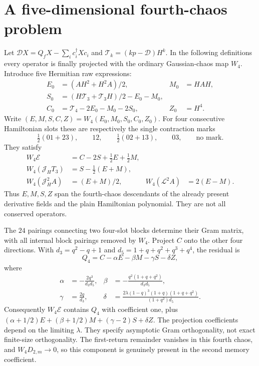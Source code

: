 \documentclass[11pt,a4paper]{article}
\begin{document}
\newpage
\section{A five-dimensional fourth-chaos problem}
Let $\mathcal D X=Q_fX-\sum_i c_i^\dagger Xc_i$ and
$\mathcal T_k=(kp-\mathcal D)H^k$. In the following definitions every
operator is finally projected with the ordinary Gaussian-chaos map
$W_4$. Introduce five Hermitian raw expressions:
\begin{align}
 E_0&=(AH^2+H^2A)/2,& M_0&=HAH,\\
 S_0&=(H\mathcal T_3+\mathcal T_3H)/2-E_0-M_0,\\
 C_0&=\mathcal T_4-2E_0-M_0-2S_0,& Z_0&=H^4.
\end{align}
Write $(E,M,S,C,Z)=W_4(E_0,M_0,S_0,C_0,Z_0)$.
For four consecutive Hamiltonian slots these are respectively the
single contraction marks
\begin{equation}
 \tfrac12(01+23),\qquad12,\qquad\tfrac12(02+13),
 \qquad03,\qquad\text{no mark}.
\end{equation}
They satisfy
\begin{align}
 W_4\mathcal E&=C-2S+\tfrac12E+\tfrac12M,\\
 W_4(\mathcal J_H T_3)&=S-\tfrac12(E+M),\\
 W_4(\mathcal J_H^2A)&=(E+M)/2,&
 W_4(\mathcal L^2A)&=2(E-M).
\end{align}
Thus $E,M,S,Z$ span the fourth-chaos descendants of the already
present derivative fields and the plain Hamiltonian polynomial.
They are not all conserved operators.

The $24$ pairings connecting two four-slot blocks determine their
Gram matrix, with all internal block pairings removed by $W_4$.
Project $C$ onto the other four directions. With
$d_3=q^2-q+1$ and $d_5=1+q+q^2+q^3+q^4$, the residual is
\begin{equation}\label{eq:Q4}
 Q_4=C-\alpha E-\beta M-\gamma S-\delta Z,
\end{equation}
where
\begin{align}
 \alpha&=-\frac{2q^3}{d_3d_5},&
 \beta&=-\frac{q^2(1+q+q^2)}{d_3d_5},\\
 \gamma&=\frac{2q}{d_3},&
 \delta&=\frac{2\lambda(1-q)^3(1+q)(1+q+q^2)}{(1+q^2)d_5}.
\end{align}
Consequently $W_4\mathcal E$ contains $Q_4$ with coefficient one,
plus $(\alpha+1/2)E+(\beta+1/2)M+(\gamma-2)S+\delta Z$.
The projection coefficients depend on the limiting $\lambda$.
They specify asymptotic Gram orthogonality, not exact finite-size
orthogonality. The first-return remainder vanishes in this fourth
chaos, and $W_4D_{2,m}\to0$, so this component is genuinely present
in the second memory coefficient.
\end{document}
